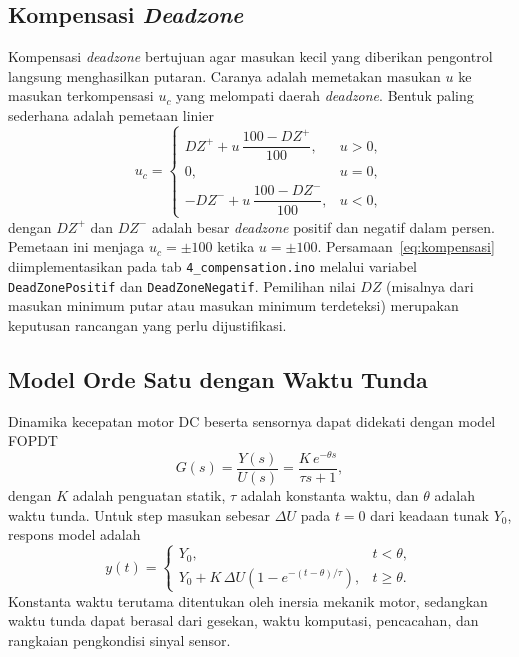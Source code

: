 \documentclass[11pt,a4paper]{article}
\newcommand{\prog}[1]{\texttt{#1}}
\begin{document}
\subsection{Kompensasi \textit{Deadzone}}
Kompensasi \textit{deadzone} bertujuan agar masukan kecil yang diberikan pengontrol langsung menghasilkan putaran. Caranya adalah memetakan masukan $u$ ke masukan terkompensasi $u_c$ yang melompati daerah \textit{deadzone}. Bentuk paling sederhana adalah pemetaan linier
\begin{equation}
	u_c =
	\begin{cases}
		DZ^{+} + u\,\dfrac{100 - DZ^{+}}{100}, & u > 0,  \\[2mm]
		0,                                      & u = 0,  \\[1mm]
		-DZ^{-} + u\,\dfrac{100 - DZ^{-}}{100}, & u < 0,
	\end{cases}
	\label{eq:kompensasi}
\end{equation}
dengan $DZ^{+}$ dan $DZ^{-}$ adalah besar \textit{deadzone} positif dan negatif dalam persen. Pemetaan ini menjaga $u_c = \pm 100$ ketika $u = \pm 100$. Persamaan~\eqref{eq:kompensasi} diimplementasikan pada tab \prog{4\_compensation.ino} melalui variabel \texttt{DeadZonePositif} dan \texttt{DeadZoneNegatif}. Pemilihan nilai $DZ$ (misalnya dari masukan minimum putar atau masukan minimum terdeteksi) merupakan keputusan rancangan yang perlu dijustifikasi.

\subsection{Model Orde Satu dengan Waktu Tunda}
Dinamika kecepatan motor DC beserta sensornya dapat didekati dengan model FOPDT
\begin{equation}
	G(s) = \frac{Y(s)}{U(s)} = \frac{K\,e^{-\theta s}}{\tau s + 1},
	\label{eq:fopdt}
\end{equation}
dengan $K$ adalah penguatan statik, $\tau$ adalah konstanta waktu, dan $\theta$ adalah waktu tunda. Untuk step masukan sebesar $\Delta U$ pada $t = 0$ dari keadaan tunak $Y_0$, respons model adalah
\begin{equation}
	y(t) =
	\begin{cases}
		Y_0,                                                         & t < \theta,   \\
		Y_0 + K\,\Delta U \left(1 - e^{-(t-\theta)/\tau}\right),     & t \ge \theta.
	\end{cases}
	\label{eq:respons_fopdt}
\end{equation}
Konstanta waktu terutama ditentukan oleh inersia mekanik motor, sedangkan waktu tunda dapat berasal dari gesekan, waktu komputasi, pencacahan, dan rangkaian pengkondisi sinyal sensor.
\end{document}
